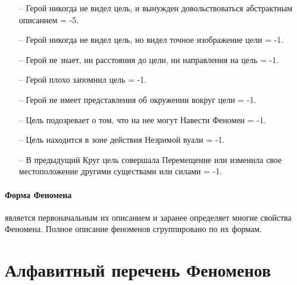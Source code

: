 \begin{itemize}
\item[--]Герой никогда не видел цель, и вынужден довольствоваться абстрактным описанием = -5.
\item[--]Герой никогда не видел цель, но видел точное изображение цели = -1.
\item[--]Герой не знает, ни расстояния до цели, ни направления на цель = -1.
\item[--]Герой плохо запомнил цель = -1.
\item[--]Герой не имеет представления об окружении вокруг цели = -1.
\item[--]Цель подозревает о том, что на нее могут Навести Феномен = -1.
\item[--]Цель находится в зоне действия Незримой вуали = -1.
\item[--]В предыдущий Круг цель совершала Перемещение или изменила свое местоположение другими существами или силами = -1.
\end{itemize}

\paragraph{Форма Феномена} является первоначальным их описанием и заранее определяет многие свойства Феномена.
\newline Полное описание феноменов сгруппировано по их формам.


\section{Алфавитный перечень Феноменов}
\printindex[powers]
